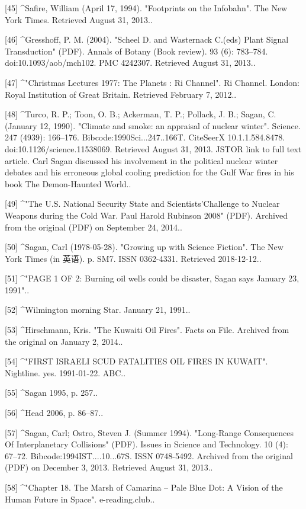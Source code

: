 [45]
^Safire, William (April 17, 1994). "Footprints on the Infobahn". The New York Times. Retrieved August 31, 2013..

[46]
^Gresshoff, P. M. (2004). "Scheel D. and Wasternack C.(eds) Plant Signal Transduction" (PDF). Annals of Botany (Book review). 93 (6): 783–784. doi:10.1093/aob/mch102. PMC 4242307. Retrieved August 31, 2013..

[47]
^"Christmas Lectures 1977: The Planets : Ri Channel". Ri Channel. London: Royal Institution of Great Britain. Retrieved February 7, 2012..

[48]
^Turco, R. P.; Toon, O. B.; Ackerman, T. P.; Pollack, J. B.; Sagan, C. (January 12, 1990). "Climate and smoke: an appraisal of nuclear winter". Science. 247 (4939): 166–176. Bibcode:1990Sci...247..166T. CiteSeerX 10.1.1.584.8478. doi:10.1126/science.11538069. Retrieved August 31, 2013. JSTOR link to full text article. Carl Sagan discussed his involvement in the political nuclear winter debates and his erroneous global cooling prediction for the Gulf War fires in his book The Demon-Haunted World..

[49]
^"The U.S. National Security State and Scientists'Challenge to Nuclear Weapons during the Cold War. Paul Harold Rubinson 2008" (PDF). Archived from the original (PDF) on September 24, 2014..

[50]
^Sagan, Carl (1978-05-28). "Growing up with Science Fiction". The New York Times (in 英语). p. SM7. ISSN 0362-4331. Retrieved 2018-12-12..

[51]
^"PAGE 1 OF 2: Burning oil wells could be disaster, Sagan says January 23, 1991"..

[52]
^Wilmington morning Star. January 21, 1991..

[53]
^Hirschmann, Kris. "The Kuwaiti Oil Fires". Facts on File. Archived from the original on January 2, 2014..

[54]
^"FIRST ISRAELI SCUD FATALITIES OIL FIRES IN KUWAIT". Nightline. yes. 1991-01-22. ABC..

[55]
^Sagan 1995, p. 257..

[56]
^Head 2006, p. 86–87..

[57]
^Sagan, Carl; Ostro, Steven J. (Summer 1994). "Long-Range Consequences Of Interplanetary Collisions" (PDF). Issues in Science and Technology. 10 (4): 67–72. Bibcode:1994IST....10...67S. ISSN 0748-5492. Archived from the original (PDF) on December 3, 2013. Retrieved August 31, 2013..

[58]
^"Chapter 18. The Marsh of Camarina – Pale Blue Dot: A Vision of the Human Future in Space". e-reading.club..


